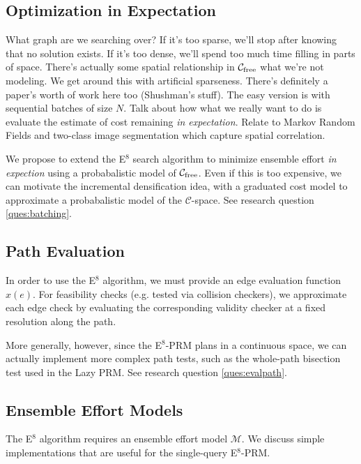 \subsection{Optimization in Expectation}

What graph are we searching over?
If it's too sparse, we'll stop after knowing that no solution exists.
If it's too dense, we'll spend too much time filling in parts of
space.
There's actually some spatial relationship in
$\mathcal{C}_{\mbox{\scriptsize free}}$ what we're not
modeling.
We get around this with artificial sparseness.
There's definitely a paper's worth of work here too (Shushman's stuff).
The easy version is with sequential batches of size $N$.
Talk about how what we really want to do
is evaluate the estimate of cost remaining
\emph{in expectation}.
Relate to Markov Random Fields and two-class image segmentation
which capture spatial correlation.

We propose to extend the E$^8$ search algorithm
to minimize ensemble effort \emph{in expection}
using a probabalistic model of $\mathcal{C}_{\mbox{\scriptsize free}}$.
Even if this is too expensive,
we can motivate the incremental densification idea,
with a graduated cost model
to approximate a probabalistic model
of the $\mathcal{C}$-space.
See research question \ref{ques:batching}.

\subsection{Path Evaluation}
\label{subsec:prm-path-eval}

In order to use the E$^8$ algorithm,
we must provide an edge evaluation function $x(e)$.
For feasibility checks
(e.g. tested via collision checkers),
we approximate each edge check
by evaluating the corresponding validity checker
at a fixed resolution along the path.

More generally, however,
since the E$^8$-PRM plans in a continuous space,
we can actually implement more complex path tests,
such as the whole-path bisection test used in the
Lazy PRM.
See research question \ref{ques:evalpath}.

\subsection{Ensemble Effort Models}

The E$^8$ algorithm requires an ensemble effort model
$\mathcal{M}$.
We discuss simple implementations that are useful
for the single-query E$^8$-PRM.

